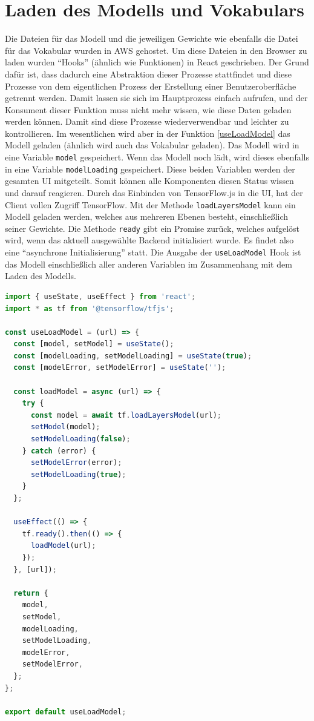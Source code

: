 \section{Laden des Modells und Vokabulars}
Die Dateien für das Modell und die jeweiligen Gewichte wie ebenfalls die Datei für das Vokabular wurden in AWS gehostet. Um diese Dateien in den Browser zu laden wurden \enquote{Hooks} (ähnlich wie Funktionen) in React geschrieben. Der Grund dafür ist, dass dadurch eine Abstraktion dieser Prozesse stattfindet und diese Prozesse von dem eigentlichen Prozess der Erstellung einer Benutzeroberfläche getrennt werden. Damit lassen sie sich im Hauptprozess einfach aufrufen, und der Konsument dieser Funktion muss nicht mehr wissen, wie diese Daten geladen werden können. Damit sind diese Prozesse wiederverwendbar und leichter zu kontrollieren.
Im wesentlichen wird aber in der Funktion \ref{useLoadModel} das Modell geladen (ähnlich wird auch das Vokabular geladen). Das Modell wird in eine Variable \texttt{model} gespeichert. Wenn das Modell noch lädt, wird dieses ebenfalls in eine Variable \texttt{modelLoading} gespeichert. Diese beiden Variablen werden der gesamten UI mitgeteilt. Somit können alle Komponenten diesen Status wissen und darauf reagieren. Durch das Einbinden von TensorFlow.js in die UI, hat der Client vollen Zugriff  TensorFlow. Mit der Methode \texttt{loadLayersModel} kann ein Modell geladen werden, welches aus mehreren Ebenen besteht, einschließlich seiner Gewichte. Die Methode \texttt{ready} gibt ein Promise zurück, welches aufgelöst wird, wenn das aktuell ausgewählte Backend initialisiert wurde. Es findet also eine \enquote{asynchrone Initialisierung} statt. Die Ausgabe der \texttt{useLoadModel} Hook ist das Modell einschließlich aller anderen Variablen im Zusammenhang mit dem Laden des Modells.


\begin{lstlisting}[language=JavaScript, caption=Das useLoadModel Hook, label={useLoadModel}]
import { useState, useEffect } from 'react';
import * as tf from '@tensorflow/tfjs';

const useLoadModel = (url) => {
  const [model, setModel] = useState();
  const [modelLoading, setModelLoading] = useState(true);
  const [modelError, setModelError] = useState('');
  
  const loadModel = async (url) => {
    try {
      const model = await tf.loadLayersModel(url);
      setModel(model);
      setModelLoading(false);
    } catch (error) {
      setModelError(error);
      setModelLoading(true);
    }
  };

  useEffect(() => {
    tf.ready().then(() => {
      loadModel(url);
    });
  }, [url]);

  return {
    model,
    setModel,
    modelLoading,
    setModelLoading,
    modelError,
    setModelError,
  };
};

export default useLoadModel;
\end{lstlisting}

